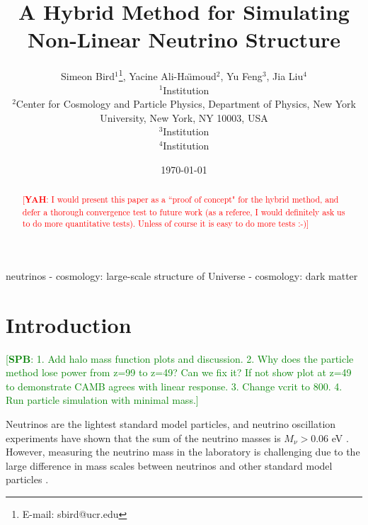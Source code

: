 \documentclass[useAMS, usenatbib]{mnras}
\newcommand{\spb}[1]{{\textcolor{green}{[{\bf SPB}: #1]}}}
\newcommand{\yah}[1]{{\textcolor{red}{[{\bf YAH}: #1]}}}
\begin{document}
\title{A Hybrid Method for Simulating Non-Linear Neutrino Structure}
\author[ S. Bird et al.]{  Simeon Bird$^1$\thanks{E-mail: sbird@ucr.edu}, Yacine Ali-Ha\"{\i}moud$^2$, Yu Feng$^3$, Jia Liu$^4$\vspace{1.5mm}\\
$^1$Institution\\
$^2$Center for Cosmology and Particle Physics, Department of Physics,
New York University, New York, NY 10003, USA\\
$^3$Institution\\
$^4$Institution}

\date{\today}

\pagerange{\pageref{firstpage}--\pageref{lastpage}} 
\label{firstpage}

\maketitle

\begin{abstract}
\yah{I would present this paper as a ``proof of concept" for the hybrid method, and defer a thorough convergence test to future work (as a referee, I would definitely ask us to do more quantitative tests). Unless of course it is easy to do more tests :-)}

\end{abstract}

\begin{keywords}
        neutrinos - cosmology: large-scale structure of Universe - cosmology: dark matter
\end{keywords}

\section{Introduction}

\spb{1. Add halo mass function plots and discussion. 2. Why does the particle method lose power from z=99 to z=49? Can we fix it? If not show plot at z=49 to demonstrate CAMB agrees with linear response. 3. Change vcrit to 800. 4. Run particle simulation with minimal mass.}


Neutrinos are the lightest standard model particles, and neutrino oscillation experiments have shown that the sum of the neutrino masses is $M_\nu > 0.06$ eV \citep{Becker-Szendy_1992, Fukuda_1998}.
However, measuring the neutrino mass in the laboratory is challenging due to the large difference in mass scales between neutrinos and other standard model particles \cite[although see][]{Wolf_2010}.
\end{document}
